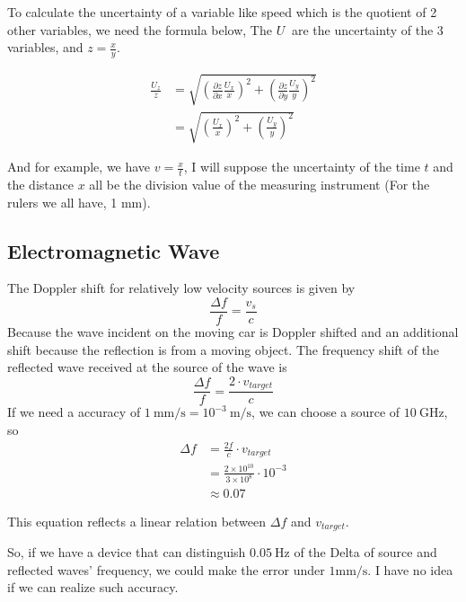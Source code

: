 \documentclass{article}
\begin{document}
To calculate the uncertainty of a variable like speed which is the quotient of 2 other variables, we need the formula
below, The $U~$ are the uncertainty of the 3 variables, and $z = \frac{x}{y}$.


\begin{align}
    \frac{U_z}{z} & = \sqrt{ (\frac{\partial z}{\partial x} \frac{U_x}{x})^2 +  (\frac{\partial z}{\partial y} \frac
     {U_y}{y})^2} \label{fomula} \\
                  & = \sqrt{ ( \frac{U_x}{x})^2 +  (\frac{U_y}{y})^2}
\end{align}

And for example, we have $v = \frac{x}{t}$, I will suppose the uncertainty of the time $t$ and the distance $x$ all be
the division value of the measuring instrument (For the rulers we all have, 1 mm).



\subsection{Electromagnetic Wave} The Doppler shift for relatively low velocity sources is given by
\begin{equation}
    \frac{\Delta f}{f} = \frac{v_s}{c}
\end{equation} Because the wave incident on the moving car is Doppler shifted and an additional shift because the
 reflection is from a moving object. The frequency shift of the reflected wave received at the source of the wave is
\begin{equation}
    \frac{\Delta f}{f} = \frac{2 \cdot v_{target}}{c}
\end{equation} If we need a accuracy of $1~\mathrm{mm/s} = 10^{-3}~\mathrm{m/s}$, we can choose a source of $10~\mathrm
 {GHz}$, so
\begin{equation}
    \begin{aligned}
        \Delta f & = \frac{2f}{c} \cdot v_{target}                        \\
                 & = \frac{2 \times 10^{10}}{3\times10^{8}} \cdot 10^{-3} \\
                 & \approx 0.07
    \end{aligned}
\end{equation}

This equation reflects a linear relation between $\Delta f$ and $v_{target}$.

So, if we have a device that can distinguish $0.05~\mathrm{Hz}$ of the Delta of source and reflected waves' frequency,
we could make the error under $1\mathrm{mm/s}$. I have no idea if we can realize such accuracy.
\end{document}
